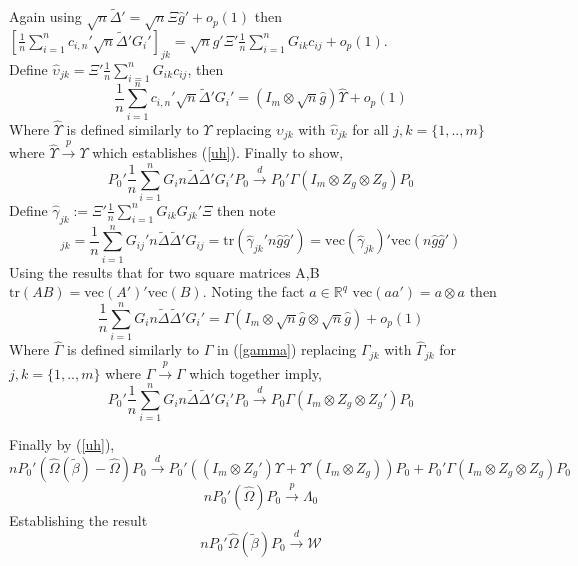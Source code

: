 \documentclass[11pt, fleqn]{article}
\begin{document}
Again using $\sqrt{n}\tilde{\Delta}'=\sqrt{n}\Xi\hat{g}'+o_p(1)$
then $ [\frac{1}{n}\sum_{i=1}^n c_{i,n}'\sqrt{n}\tilde{\Delta}' G_i']_{jk}=\sqrt{n}\hat{g}'\Xi'\frac{1}{n}\sum_{i=1}^nG_{ik}c_{ij}+o_p(1)$.\\
Define $\hat{\upsilon}_{jk}=\Xi'\frac{1}{n}\sum_{i=1}^nG_{ik}c_{ij}$, then
\begin{equation}\frac{1}{n}\sum_{i=1}^n c_{i,n}'\sqrt{n}\tilde{\Delta}' G_i'=(I_m \otimes \sqrt{n}\hat{g}) \hat{\Upsilon}+ o_p(1) \end{equation}
Where $\hat{\Upsilon}$ is defined similarly to $\Upsilon$ replacing $\upsilon_{jk}$ with $\hat{\upsilon}_{jk}$ for all $j,k=\{1,..,m\}$ where $\hat{\Upsilon}\overset{p}{\rightarrow} \Upsilon$ which  establishes (\ref{uh}). Finally to show,
\begin{equation}\label{f}P_0'\frac{1}{n}\sum_{i=1}^n G_in\tilde{\Delta}\tilde{\Delta}' G_i'P_0
\overset{d}{\rightarrow}P_0'\Gamma(I_m\otimes Z_g\otimes Z_g)P_0\end{equation}
Define $\hat{\gamma}_{jk}:=\Xi'\frac{1}{n}\sum_{i=1}^nG_{ik}G_{jk}'\Xi$ then note
\begin{equation} [\frac{1}{n}\sum_{i=1}^n G_i n\tilde{\Delta}\tilde{\Delta}' G_i']_{jk}=\frac{1}{n}\sum_{i=1}^n G_{ij}'n\tilde{\Delta}\tilde{\Delta}' G_{ij}=\textrm{tr}(\hat{\gamma}_{jk}' n\hat{g}\hat{g}')=\textrm{vec}(\hat{\gamma}_{jk})'\textrm{vec}(n\hat{g}\hat{g}')\end{equation}
Using the results that for two  square matrices A,B $\textrm{tr}(AB)=\textrm{vec}(A')'\textrm{vec}(B)$.
Noting the fact $a\in \mathbb{R}^q$  $\textrm{vec}(aa')=a\otimes a$ then
\begin{equation} \frac{1}{n}\sum_{i=1}^n G_i n\tilde{\Delta}\tilde{\Delta}' G_i'=\hat{\Gamma}(I_m \otimes \sqrt{n}\hat{g} \otimes \sqrt{n}\hat{g})+o_p(1)\end{equation}
Where $\hat{\Gamma}$ is defined similarly to $\Gamma$ in (\ref{gamma}) replacing $\Gamma_{jk}$ with $\hat{\Gamma}_{jk}$ for $j,k=\{1,..,m\}$ where $\hat{\Gamma}\overset{p}{\rightarrow} \Gamma$ which together imply,
\begin{equation}\label{g} P_0' \frac{1}{n}\sum_{i=1}^n G_i n\tilde{\Delta}\tilde{\Delta}' G_i'P_0\overset{d}{\rightarrow} P_0\Gamma(I_m\otimes Z_g \otimes Z_g')P_0 \end{equation}



Finally by (\ref{uh}), \begin{equation} n P_0'(\hat{\Omega}(\tilde{\beta})-\hat{\Omega})P_0\overset{d}{\rightarrow} 
 P_0' \left( (I_m\otimes Z_g')\Upsilon+\Upsilon'(I_m \otimes Z_g)\right)P_0+P_0'\Gamma(I_m\otimes Z_g\otimes Z_g) P_0 
\end{equation}
\begin{equation}nP_0'(\hat{\Omega})P_0\overset{p}{\rightarrow} \Lambda_0 \end{equation}
Establishing the result
\begin{equation}nP_0'\hat{\Omega}(\tilde{\beta})P_0\overset{d}{\rightarrow} \mathcal{W} \end{equation}
\end{document}
